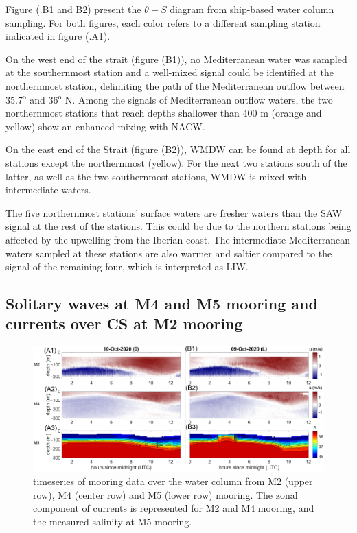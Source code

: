 Figure (.B1 and B2) present the $\theta-S$ diagram from ship-based water column sampling. For both figures, each color refers to a different sampling station indicated in figure (.A1).

On the west end of the strait (figure (B1)), no Mediterranean water was sampled at the southernmost station and a well-mixed signal could be identified at the northernmost station, delimiting the path of the Mediterranean outflow between 35.7$^{\text{o}}$ and 36$^{\text{o}}$ N. Among the signals of Mediterranean outflow waters, the two northernmost stations that reach depths shallower than 400 m (orange and yellow) show an enhanced mixing with NACW.

On the east end of the Strait (figure (B2)), WMDW can be found at depth for all stations except the northernmost (yellow). For the next two stations south of the latter, as well as the two southernmost stations, WMDW is mixed with intermediate waters. 

The five northernmost stations' surface waters are fresher waters than the SAW signal at the rest of the stations. This could be due to the northern stations being affected by the upwelling from the Iberian coast. The intermediate Mediterranean waters sampled at these stations are also warmer and saltier compared to the signal of the remaining four, which is interpreted as LIW.


\subsection{Solitary waves at M4 and M5 mooring and currents over CS at M2 mooring}
\label{section_obs_moor}

\begin{figure}[!h]
 \includegraphics[width=\textwidth]{./GBR3D/US_moorings1.png}
 \caption {timeseries of mooring data over the water column from M2 (upper row), M4 (center row) and M5 (lower row) mooring. The zonal component of currents is represented for M2 and M4 mooring, and the measured salinity at M5 mooring.}
 \label{fig_moor_US1}
\end{figure}


